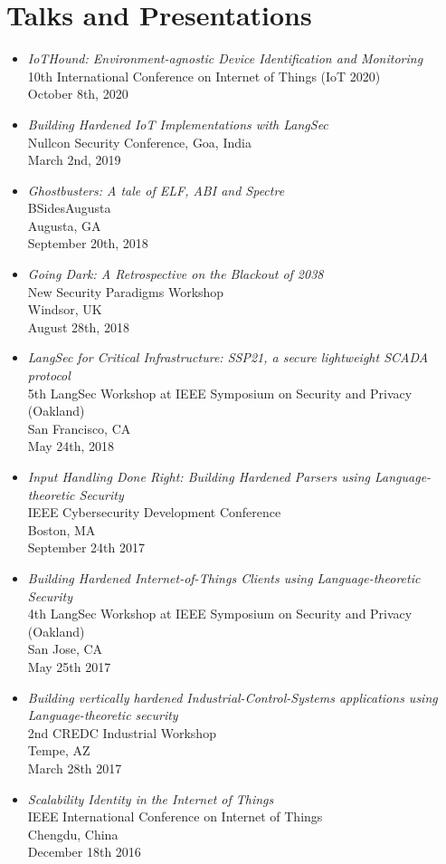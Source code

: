 \documentclass[letterpaper,10pt]{article}
\begin{document}
  \section*{\color{dartmouthgreen} Talks and Presentations}
  \begin{itemize}
    \setlength\itemsep{0ex}
    \item \textit{IoTHound: Environment-agnostic Device Identification and Monitoring} \\ 10th International Conference on Internet of Things (IoT 2020) \\
      October 8th, 2020 
    \item \textit{Building Hardened IoT Implementations with LangSec} \\
      Nullcon Security Conference, Goa, India \\
      March 2nd, 2019
    \item \textit{Ghostbusters: A tale of ELF, ABI and Spectre} \\ BSidesAugusta\\ Augusta, GA \\ September 20th, 2018
    \item \textit{Going Dark: A Retrospective on the Blackout of 2038} \\ New Security Paradigms Workshop \\ Windsor, UK \\ August 28th, 2018
    \item \textit{LangSec for Critical Infrastructure: SSP21, a secure lightweight SCADA protocol} \\ 5th LangSec Workshop at IEEE Symposium on Security and Privacy (Oakland)\\ San Francisco, CA\\ May 24th, 2018
    \item \textit{Input Handling Done Right: Building Hardened Parsers using Language-theoretic Security} \\ IEEE Cybersecurity Development Conference\\ Boston, MA\\ September 24th 2017
    \item \textit{Building Hardened Internet-of-Things Clients using Language-theoretic Security}\\ 4th LangSec Workshop at IEEE Symposium on Security and Privacy (Oakland)\\ San Jose, CA\\ May 25th 2017
    \item \textit{Building vertically hardened Industrial-Control-Systems applications using Language-theoretic security}\\ 2nd CREDC Industrial Workshop\\ Tempe, AZ\\ March 28th 2017
    \item \textit{Scalability Identity in the Internet of Things}\\ IEEE International Conference on Internet of Things\\ Chengdu, China\\ December 18th 2016
  \end{itemize}
\end{document}

